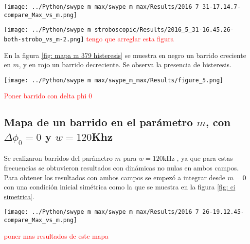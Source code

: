 			\begin{center}
				\texttt{[image: ../Python/swype m max/swype\_m\_max/Results/2016\_7\_31-17.14.7-compare\_Max\_vs\_m.png]}
				\label{fig: mapa m 379 colores}
			\end{center}
					
			\begin{center}
				\texttt{[image: ../Python/swype m stroboscopic/Results/2016\_5\_31-16.45.26-both-strobo\_vs\_m-2.png]}
				\label{fig: swype m 379 strobo histeresis}
				\textcolor{red}{tengo que arreglar esta figura}
			\end{center}
			
			En la figura \ref{fig: mapa m 379 histeresis} se muestra en negro un barrido creciente en $m$, y en rojo un barrido decreciente.
			Se observa la presencia de histeresis.
			
			\begin{center}
				\texttt{[image: ../Python/swype m max/swype\_m\_max/Results/figure\_5.png]}
				\label{fig: mapa m 379 histeresis}
			\end{center}
					
			\textcolor{red}{Poner barrido con delta phi 0 }
%			 
		\subsection{Mapa de un barrido en el parámetro $m$, con $\Delta \phi_0 = 0 $ y $w=120$Khz}
		
		Se realizaron barridos del parámetro $m$ para $w=120$kHz , ya que para estas frecuencias se obtuvieron resultados con dinámicas no nulas en ambos campos.
		Para obtener los resultados con ambos campos se empezó a integrar desde  $m=0$ con una condición inicial simétrica como la que se muestra en la figura \ref{fig: ci simetrica}. 
		
			\begin{center}
				\texttt{[image: ../Python/swype m max/swype\_m\_max/Results/2016\_7\_26-19.12.45-compare\_Max\_vs\_m.png]}
				\label{fig: mapa m 120}
			\end{center}		
		\textcolor{red}{poner mas resultados de este mapa}
		
